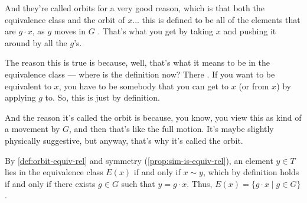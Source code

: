 \begin{speech}[00:13:59 - 00:14:51]
And they're called orbits for a very good reason, which is that both the equivalence class and the orbit of $x$... this is defined to be all of the elements that are $g \cdot x$, as $g$ moves in $G$ . That's what you get by taking $x$ and pushing it around by all the $g$'s.

The reason this is true is because, well, that's what it means to be in the equivalence class --- where is the definition now? There . If you want to be equivalent to $x$, you have to be somebody that you can get to $x$ (or from $x$) by applying $g$ to. So, this is just by definition.

And the reason it's called the orbit is because, you know, you view this as kind of a movement by $G$, and then that's like the full motion. It's maybe slightly physically suggestive, but anyway, that's why it's called the orbit.
\end{speech}

\begin{content}

\begin{steps}
By \cref{def:orbit-equiv-rel} and symmetry (\cref{prop:sim-is-equiv-rel}), an element $y \in T$ lies in the equivalence class $E(x)$ if and only if $x \sim y$, which by definition holds if and only if there exists $g \in G$ such that $y = g \cdot x$. Thus, $E(x) = \{ g \cdot x \mid g \in G \}$.
\end{steps}
\end{content}

